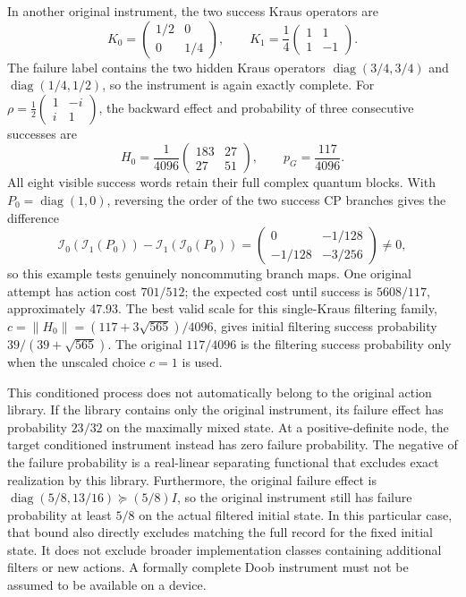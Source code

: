 \documentclass[
  11pt,
  oneside]{book}
\begin{document}
In another original instrument, the two success Kraus operators are \[
K_0=\begin{pmatrix}1/2&0\\0&1/4\end{pmatrix},\qquad
K_1=\frac14\begin{pmatrix}1&1\\1&-1\end{pmatrix}.
\] The failure label contains the two hidden Kraus operators
\(\operatorname{diag}(3/4,3/4)\) and \(\operatorname{diag}(1/4,1/2)\),
so the instrument is again exactly complete. For
\(\rho=\frac12\begin{pmatrix}1&-i\\i&1\end{pmatrix}\), the backward
effect and probability of three consecutive successes are \[
H_0=\frac1{4096}\begin{pmatrix}183&27\\27&51\end{pmatrix},\qquad
p_G=\frac{117}{4096}.
\] All eight visible success words retain their full complex quantum
blocks. With \(P_0=\operatorname{diag}(1,0)\), reversing the order of
the two success CP branches gives the difference \[
\mathcal I_0(\mathcal I_1(P_0))-\mathcal I_1(\mathcal I_0(P_0))
=\begin{pmatrix}0&-1/128\\-1/128&-3/256\end{pmatrix}\ne0,
\] so this example tests genuinely noncommuting branch maps. One
original attempt has action cost \(701/512\); the expected cost until
success is \(5608/117\), approximately 47.93. The best valid scale for
this single-Kraus filtering family,
\(c=\|H_0\|=(117+3\sqrt{565})/4096\), gives initial filtering success
probability \(39/(39+\sqrt{565})\). The original \(117/4096\) is the
filtering success probability only when the unscaled choice \(c=1\) is
used.

This conditioned process does not automatically belong to the original
action library. If the library contains only the original instrument,
its failure effect has probability \(23/32\) on the maximally mixed
state. At a positive-definite node, the target conditioned instrument
instead has zero failure probability. The negative of the failure
probability is a real-linear separating functional that excludes exact
realization by this library. Furthermore, the original failure effect is
\(\operatorname{diag}(5/8,13/16)\succeq(5/8)I\), so the original
instrument still has failure probability at least \(5/8\) on the actual
filtered initial state. In this particular case, that bound also
directly excludes matching the full record for the fixed initial state.
It does not exclude broader implementation classes containing additional
filters or new actions. A formally complete Doob instrument must not be
assumed to be available on a device.
\end{document}
